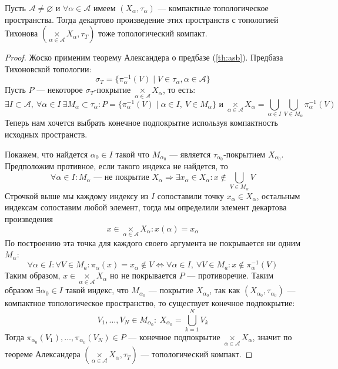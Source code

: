 \begin{theorem}
	Пусть $\mathscr{A} \neq \varnothing$ и $\forall \alpha \in \mathscr{A}$ имеем $(X_\alpha, \tau_\alpha)$ --- компактные топологическое пространства. Тогда декартово произведение этих пространств с топологией Тихонова $\left(\underset{\alpha \in \mathscr{A}}{\times} X_\alpha, \tau_T\right)$ тоже топологический компакт.
\end{theorem}
\begin{proof}
	Жоско применим теорему Александера о предбазе (\ref{th:asb}). Предбаза Тихоновской топологии:
	$$
	\sigma_T = \{\pi_\alpha^{-1}(V) \mid V \in \tau_\alpha, \alpha \in \mathscr{A}\}
	$$
	Пусть $P$ --- некоторое $\sigma_T$-покрытие $\underset{\alpha \in \mathscr{A}}{\times} X_\alpha$, то есть:
	$$
	\exists I \subset \mathscr{A}, \ \forall \alpha \in I  \ \exists M_\alpha \subset \tau_\alpha : P = \{\pi_\alpha^{-1}(V) \mid \alpha \in I, \ V \in M_\alpha\} \text{ и } \underset{\alpha \in \mathscr{A}}{\times} X_\alpha = \bigcup_{\alpha \in I }\bigcup_{V \in M_\alpha} \pi_\alpha^{-1}(V)
	$$
	Теперь нам хочется выбрать конечное подпокрытие используя компактность исходных пространств. 
	
	Покажем, что найдется $\alpha_0 \in I$ такой что $M_{\alpha_0}$ --- является $\tau_{\alpha_0}$-покрытием $X_{\alpha_0}$. Предположим противное, если такого индекса не найдется, то 
	$$
	\forall  \alpha \in I: M_\alpha \text{ --- не покрытие $X_\alpha$} \Rightarrow \exists x_\alpha \in X_\alpha: x \notin \bigcup_{V \in M_\alpha}V
 	$$
 	Строчкой выше мы каждому индексу из $I$ сопоставили точку $x_\alpha \in X_\alpha$, остальным индексам сопоставим любой элемент, тогда мы определили элемент декартова произведения 
 	$$
 	x \in \underset{\alpha \in \mathscr{A}}{\times} X_\alpha: x(\alpha) = x_\alpha
 	$$
 	По построению эта точка для каждого своего аргумента  не покрывается ни одним  $M_\alpha$:
 	$$
 	\forall \alpha \in I: \forall V \in M_a: \pi_\alpha(x) = x_\alpha \notin V \Leftrightarrow \forall \alpha \in I, \ \forall V \in M_a: x \notin \pi_\alpha^{-1}(V)
 	$$
 	Таким образом, $x \in \underset{\alpha \in \mathscr{A}}{\times} X_\alpha$ но не покрывается $P$ --- противоречие. Таким образом $\exists \alpha_0 \in I$ такой индекс, что $M_{\alpha_0}$ --- покрытие $X_{\alpha_0}$, так как $(X_{\alpha_0}, \tau_{\alpha_0})$ --- компактное топологическое пространство, то существует конечное подпокрытие: 
 	$$
 	V_1, \dots, V_N \in M_{\alpha_0}: \ X_{\alpha_0} = \bigcup_{k=1}^N V_k
 	$$
 	Тогда $\pi_{\alpha_0}(V_1), \dots, \pi_{\alpha_0}(V_N) \in P$ --- конечное подпокрытие  $\underset{\alpha \in \mathscr{A}}{\times} X_\alpha$, значит по теореме Александера $\left(\underset{\alpha \in \mathscr{A}}{\times} X_\alpha, \tau_T\right)$ --- топологический компакт.
\end{proof}